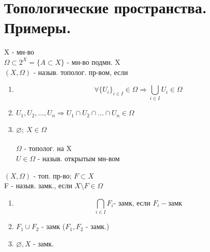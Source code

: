 \documentclass[geometry.tex]{subfiles}
\begin{document}
  \section{Топологические пространства. Примеры.}

  \begin{definition}
      X - мн-во\\
      $\Omega \subset 2^X = \{A \subset X\}$ - мн-во подмн. X\\
      $(X, \Omega)$ - назыв. тополог. пр-вом, если\\
      \begin{enumerate}
          \item \[\forall \{U_i\}_{i \in I} \in \Omega \Rightarrow\bigcup_{i \in I} U_i \in \Omega\]
          \item $U_1, U_2, ..., U_n \Rightarrow U_1 \cap U_2 \cap ... \cap U_n \in \Omega$
          \item $\varnothing; \  X \in \Omega$\\\\
          $\Omega$ - тополог. на X\\
          $U \in \Omega$ - назыв. открытым мн-вом
      \end{enumerate}
  \end{definition}

  \begin{definition}
      $(X, \Omega)$ - топ. пр-во; $F \subset X$ \\
      F - назыв. замк., если $X \setminus F \in \Omega$
  \end{definition}

  \begin{theorem}
      \begin{enumerate}
          \item \[\bigcap_{i \in I} F_i \text{- замк, если } F_i - \text{замк}\]
          \item $F_1 \cup F_2$ - замк ($F_1, F_2$ - замк.)
          \item $\varnothing, X$ - замк.
      \end{enumerate}
  \end{theorem}
\end{document}
